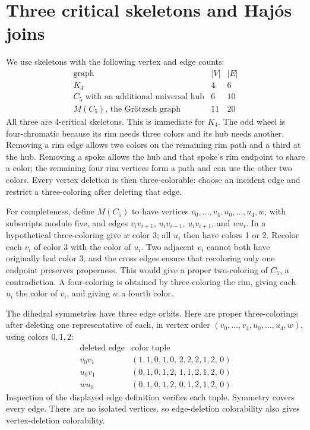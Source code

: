 \documentclass[11pt]{article}
\begin{document}
\section{Three critical skeletons and Haj\'os joins}

We use skeletons with the following vertex and edge counts:
\[
\begin{array}{c|r|r}
\text{graph}&|V|&|E|\\\hline
K_4&4&6\\
C_5\text{ with an additional universal hub}&6&10\\
M(C_5)\text{, the Gr\"otzsch graph}&11&20
\end{array}
\]
All three are 4-critical skeletons. This is immediate for $K_4$.
The odd wheel is four-chromatic because its rim needs three colors and
its hub needs another. Removing a rim edge allows two colors on the
remaining rim path and a third at the hub. Removing a spoke allows the
hub and that spoke's rim endpoint to share a color; the remaining four
rim vertices form a path and can use the other two colors.
Every vertex deletion is then three-colorable: choose an incident edge
and restrict a three-coloring after deleting that edge.

For completeness, define $M(C_5)$ to have vertices
$v_0,\ldots,v_4,u_0,\ldots,u_4,w$, with subscripts modulo five, and
edges $v_iv_{i+1}$, $u_iv_{i-1}$, $u_iv_{i+1}$, and $wu_i$.
In a hypothetical three-coloring give $w$ color 3; all $u_i$ then have
colors 1 or 2. Recolor each $v_i$ of color 3 with the color of $u_i$.
Two adjacent $v_i$ cannot both have originally had color 3, and the
cross edges ensure that recoloring only one endpoint preserves properness.
This would give a proper two-coloring of $C_5$, a contradiction.
A four-coloring is obtained by three-coloring the rim, giving each $u_i$
the color of $v_i$, and giving $w$ a fourth color.

The dihedral symmetries have three edge orbits. Here are proper
three-colorings after deleting one representative of each, in vertex
order $(v_0,\ldots,v_4,u_0,\ldots,u_4,w)$, using colors $0,1,2$:
\[
\begin{array}{c|c}
\text{deleted edge}&\text{color tuple}\\\hline
v_0v_1&(1,1,0,1,0,\,2,2,2,1,2,\,0)\\
u_0v_1&(0,1,0,1,2,\,1,1,2,1,2,\,0)\\
wu_0&(0,1,0,1,2,\,0,1,2,1,2,\,0)
\end{array}
\]
Inspection of the displayed edge definition verifies each tuple.
Symmetry covers every edge. There are no isolated vertices, so
edge-deletion colorability also gives vertex-deletion colorability.
\end{document}
